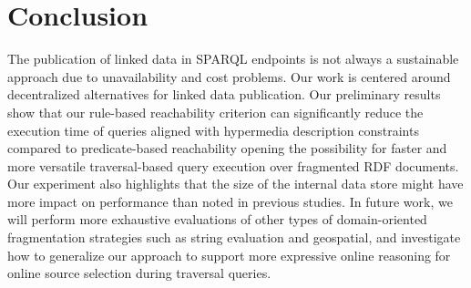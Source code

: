 \section{Conclusion}

The publication of linked data in SPARQL endpoints is not always a sustainable approach due to unavailability and cost problems.
Our work is centered around decentralized alternatives for linked data publication.
Our preliminary results show that our rule-based reachability criterion can significantly reduce the execution time of queries aligned with hypermedia description constraints compared to predicate-based reachability
opening the possibility for faster and more versatile traversal-based query execution over fragmented RDF documents.
Our experiment also highlights that the size of the internal data store might have more impact on performance than noted in previous studies.
In future work, we will perform more exhaustive evaluations of other types of domain-oriented fragmentation strategies such as string evaluation and geospatial,
and investigate how to generalize our approach to support more expressive online reasoning for online source selection during traversal queries.
